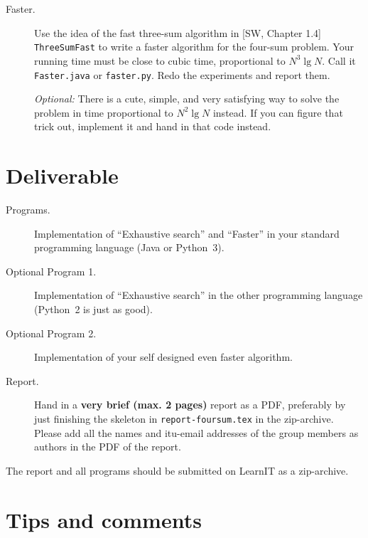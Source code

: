 \documentclass{tufte-handout}
\begin{document}
\begin{description}
\item[Faster.]
  Use the idea of the fast three-sum algorithm in [SW, Chapter 1.4] \texttt{
  ThreeSumFast} to write a faster algorithm for the four-sum problem.
  Your running time must be close to cubic time, proportional to $N^3\operatorname{lg} N$.
  Call it \texttt{Faster.java}  or \texttt{faster.py}.
  Redo the experiments and report them.

  \emph{Optional:} There is a cute, simple, and very satisfying way to solve the problem in time proportional to $N^2\operatorname{lg} N$ instead.
If you can figure that trick out, implement it and hand in that code instead.
\end{description}

\section{Deliverable}
\begin{description}
  \item[Programs.] Implementation of ``Exhaustive search'' and ``Faster'' in your standard programming language (Java or Python~3).
  \item[Optional Program 1.] Implementation of ``Exhaustive search''  in the other programming language (Python~2 is just as good).
  \item[Optional Program 2.] Implementation of your self designed even faster algorithm.
  \item[Report.]
    Hand in a \textbf{very brief (max. 2 pages)} report as a PDF, preferably by just finishing the skeleton in \texttt{report-foursum.tex} in the zip-archive.
    Please add all the names and itu-email addresses of the group members as authors in the PDF of the report.
\end{description}
The report and all programs should be submitted on LearnIT as a zip-archive.

\section{Tips and comments}
\end{document}

